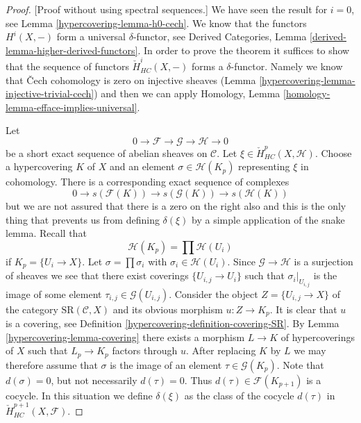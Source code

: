 \begin{proof}
[Proof without using spectral sequences.]
We have seen the result for $i = 0$, see Lemma \ref{hypercovering-lemma-h0-cech}.
We know that the functors $H^i(X, -)$ form a universal $\delta$-functor, see
Derived Categories, Lemma \ref{derived-lemma-higher-derived-functors}.
In order to prove the theorem it suffices to show that
the sequence of functors $\check{H}^i_{HC}(X, -)$ forms a
$\delta$-functor. Namely we know that {\v C}ech cohomology
is zero on injective sheaves (Lemma \ref{hypercovering-lemma-injective-trivial-cech})
and then we can apply
Homology, Lemma \ref{homology-lemma-efface-implies-universal}.

\medskip\noindent
Let
$$
0 \to \mathcal{F} \to \mathcal{G} \to \mathcal{H} \to 0
$$
be a short exact sequence of abelian sheaves on $\mathcal{C}$.
Let $\xi \in \check{H}^p_{HC}(X, \mathcal{H})$. Choose a hypercovering
$K$ of $X$ and an element $\sigma \in \mathcal{H}(K_p)$ representing
$\xi$ in cohomology. There is a corresponding exact sequence of
complexes
$$
0 \to s(\mathcal{F}(K)) \to s(\mathcal{G}(K)) \to s(\mathcal{H}(K))
$$
but we are not assured that there is a zero on the right also and this
is the only thing that
prevents us from defining $\delta(\xi)$ by a simple application of the
snake lemma. Recall that
$$
\mathcal{H}(K_p) = \prod \mathcal{H}(U_i)
$$
if $K_p = \{U_i \to X\}$. Let $\sigma =\prod \sigma_i$ with
$\sigma_i \in \mathcal{H}(U_i)$. Since $\mathcal{G} \to \mathcal{H}$ is
a surjection of sheaves we see that there exist coverings
$\{U_{i, j} \to U_i\}$ such that $\sigma_i|_{U_{i, j}}$ is the
image of some element $\tau_{i, j} \in \mathcal{G}(U_{i, j})$.
Consider the object $Z = \{U_{i, j} \to X\}$ of the category
$\text{SR}(\mathcal{C}, X)$ and its obvious morphism
$u : Z \to K_p$. It is clear that $u$ is a covering, see
Definition \ref{hypercovering-definition-covering-SR}. By
Lemma \ref{hypercovering-lemma-covering} there
exists a morphism $L \to K$ of hypercoverings of $X$ such that
$L_p \to K_p$ factors through $u$. After replacing $K$ by $L$
we may therefore assume that $\sigma$ is the image of an
element $\tau \in \mathcal{G}(K_p)$. Note that $d(\sigma) = 0$,
but not necessarily $d(\tau) = 0$. Thus $d(\tau) \in \mathcal{F}(K_{p + 1})$
is a cocycle. In this situation we define
$\delta(\xi)$ as the class of the cocycle $d(\tau)$ in
$\check{H}^{p + 1}_{HC}(X, \mathcal{F})$.


\end{proof}
